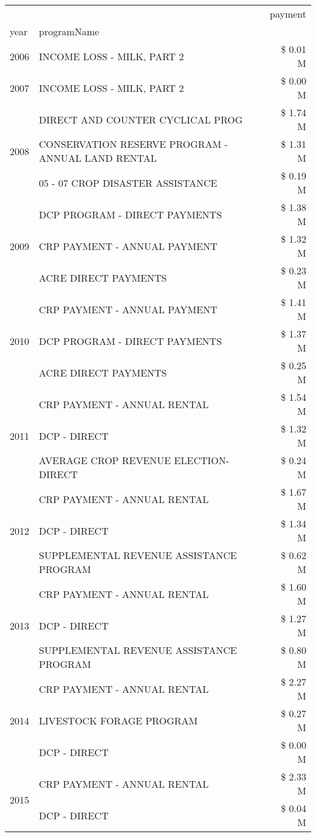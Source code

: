\begin{tabular}{llr}
\toprule
 &  & payment \\
year & programName &  \\
\midrule
2006 & INCOME LOSS - MILK, PART 2 & \$ 0.01 M \\
\cline{1-3}
2007 & INCOME LOSS - MILK, PART 2 & \$ 0.00 M \\
\cline{1-3}
\multirow[t]{3}{*}{2008} & DIRECT AND COUNTER CYCLICAL PROG & \$ 1.74 M \\
 & CONSERVATION RESERVE PROGRAM - ANNUAL LAND RENTAL & \$ 1.31 M \\
 & 05 - 07 CROP DISASTER ASSISTANCE & \$ 0.19 M \\
\cline{1-3}
\multirow[t]{3}{*}{2009} & DCP PROGRAM - DIRECT PAYMENTS & \$ 1.38 M \\
 & CRP PAYMENT - ANNUAL PAYMENT & \$ 1.32 M \\
 & ACRE DIRECT PAYMENTS & \$ 0.23 M \\
\cline{1-3}
\multirow[t]{3}{*}{2010} & CRP PAYMENT - ANNUAL PAYMENT & \$ 1.41 M \\
 & DCP PROGRAM - DIRECT PAYMENTS & \$ 1.37 M \\
 & ACRE DIRECT PAYMENTS & \$ 0.25 M \\
\cline{1-3}
\multirow[t]{3}{*}{2011} & CRP PAYMENT - ANNUAL RENTAL & \$ 1.54 M \\
 & DCP - DIRECT & \$ 1.32 M \\
 & AVERAGE CROP REVENUE ELECTION-DIRECT & \$ 0.24 M \\
\cline{1-3}
\multirow[t]{3}{*}{2012} & CRP PAYMENT - ANNUAL RENTAL & \$ 1.67 M \\
 & DCP - DIRECT & \$ 1.34 M \\
 & SUPPLEMENTAL REVENUE ASSISTANCE PROGRAM & \$ 0.62 M \\
\cline{1-3}
\multirow[t]{3}{*}{2013} & CRP PAYMENT - ANNUAL RENTAL & \$ 1.60 M \\
 & DCP - DIRECT & \$ 1.27 M \\
 & SUPPLEMENTAL REVENUE ASSISTANCE PROGRAM & \$ 0.80 M \\
\cline{1-3}
\multirow[t]{3}{*}{2014} & CRP PAYMENT - ANNUAL RENTAL & \$ 2.27 M \\
 & LIVESTOCK FORAGE PROGRAM & \$ 0.27 M \\
 & DCP - DIRECT & \$ 0.00 M \\
\cline{1-3}
\multirow[t]{3}{*}{2015} & CRP PAYMENT - ANNUAL RENTAL & \$ 2.33 M \\
 & DCP - DIRECT & \$ 0.04 M \\

\end{tabular}
